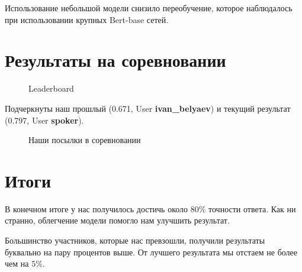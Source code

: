 \documentclass[12pt]{article}
\newcommand{\imgh}[3]
{
\begin{figure}[H]
\center{\texttt{[image: \#2]}}
\caption{#3}
\label{ris:#2}
\end{figure}
}
\begin{document}
Использование небольшой модели снизило переобучение, которое наблюдалось при использовании крупных Bert-base сетей.

\newpage

\section{Результаты на соревновании}

\imgh{16cm}{submits.png}{Leaderboard}

Подчеркнуты наш прошлый (0.671, User \textbf{ivan\_belyaev}) и текущий результат (0.797, User \textbf{spoker}).

\imgh{16cm}{scores.png}{Наши посылки в соревновании}


\newpage

\section{Итоги}

В конечном итоге у нас получилось достичь около 80$\%$ точности ответа. Как ни странно, облегчение модели помогло нам улучшить результат. 

Большинство участников, которые нас превзошли, получили результаты буквально на пару процентов выше. От лучшего результата мы отстаем не более чем на $5\%$.
\end{document}

